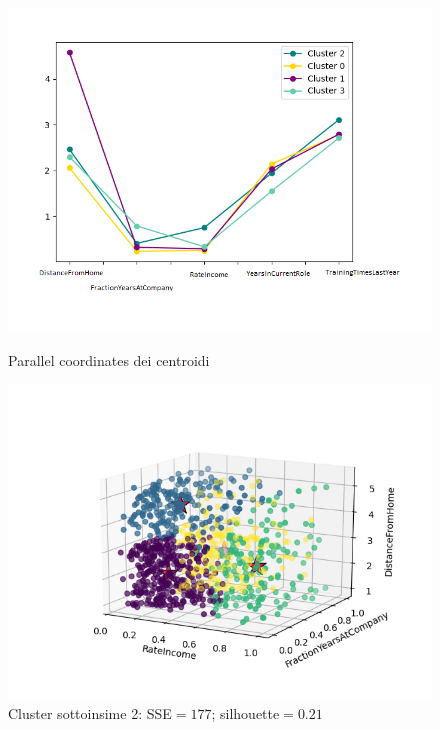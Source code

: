 \documentclass[a4paper,9pt]{article}
\begin{document}
\begin{figure}[H]
\begin{minipage}[b]{0.47\textwidth}
\centering
\includegraphics[width=\textwidth]{par_cor2.png}
\caption{Parallel coordinates dei centroidi}
\label{etichetta1}
\end{minipage}
\hfill
\begin{minipage}[b]{0.55\textwidth}
\includegraphics[scale=0.6]{rate_fraction_distance2.png}
\caption{Cluster sottoinsime 2: SSE$=177$; silhouette$=0.21$}
\label{etichetta2}
\end{minipage}
\end{figure}
\end{document}
